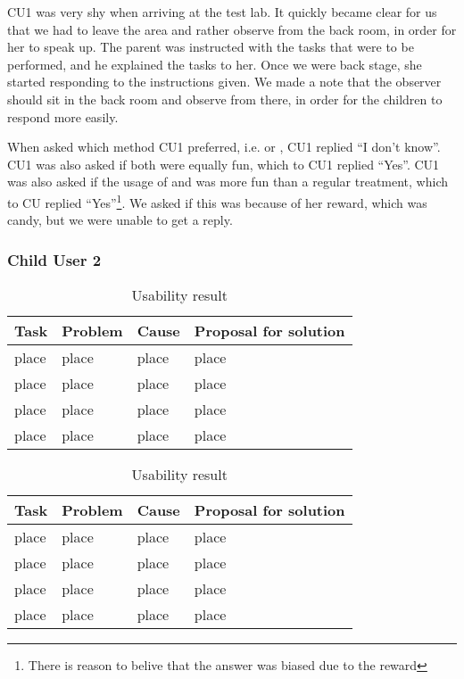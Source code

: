 CU1 was very shy when arriving at the test lab. It quickly became clear for us that we had to leave the area and rather observe from the back room, in order for her to speak up. The parent was instructed with the tasks that were to be performed, and he explained the tasks to her. Once we were back stage, she started responding to the instructions given. We made a note that the observer should sit in the back room and observe from there, in order for the children to respond more easily.   

When asked which method CU1 preferred, i.e. \app{} or \ab{}, CU1 replied ``I don't know''. CU1 was also asked if both were equally fun, which to CU1 replied ``Yes''. CU1 was also asked if the usage of \app{} and \ab{} was more fun than a regular treatment, which to CU replied ``Yes''\footnote{There is reason to belive that the answer was biased due to the reward}. We asked if this was because of her reward, which was candy, but we were unable to get a reply. 

\subsubsection{Child User 2}
\begin{table}[H]
\begin{tabular}{| p{3.0cm} | p{3.0cm} | p{3.0cm} | p{3.0cm} |}
\hline
	\textbf{Task} & \textbf{Problem} & \textbf{Cause} & \textbf{Proposal for solution} \\
	\hline
	place & place & place & place \\
	\hline
	place & place & place & place \\
	\hline
	place & place & place & place \\
	\hline
	place & place & place & place \\
	\hline
	
\end{tabular}
\label{tab:test1}
\caption{Usability result}
\end{table}

\begin{table}[H]
\begin{tabular}{| p{3.0cm} | p{3.0cm} | p{3.0cm} | p{3.0cm} |}
\hline
	\textbf{Task} & \textbf{Problem} & \textbf{Cause} & \textbf{Proposal for solution} \\
	\hline
	place & place & place & place \\
	\hline
	place & place & place & place \\
	\hline
	place & place & place & place \\
	\hline
	place & place & place & place \\
	\hline
\end{tabular}
\label{tab:test1}
\caption{Usability result}
\end{table}

